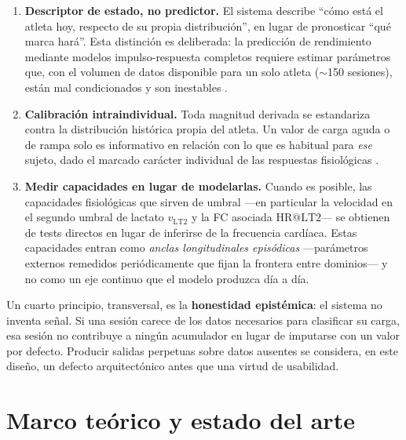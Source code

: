 \documentclass[11pt,a4paper]{article}
\begin{document}
\begin{enumerate}[leftmargin=1.4em,itemsep=2pt]
\item \textbf{Descriptor de estado, no predictor.} El sistema describe ``cómo está el atleta hoy, respecto de su propia distribución'', en lugar de pronosticar ``qué marca hará''. Esta distinción es deliberada: la predicción de rendimiento mediante modelos impulso-respuesta completos requiere estimar parámetros que, con el volumen de datos disponible para un solo atleta ($\sim$150 sesiones), están mal condicionados y son inestables \citep{hellard2006}.
\item \textbf{Calibración intraindividual.} Toda magnitud derivada se estandariza contra la distribución histórica propia del atleta. Un valor de carga aguda o de rampa solo es informativo en relación con lo que es habitual para \emph{ese} sujeto, dado el marcado carácter individual de las respuestas fisiológicas \citep{plews2013,buchheit2014}.
\item \textbf{Medir capacidades en lugar de modelarlas.} Cuando es posible, las capacidades fisiológicas que sirven de umbral —en particular la velocidad en el segundo umbral de lactato $v_{\mathrm{LT2}}$ y la FC asociada $\mathrm{HR@LT2}$— se obtienen de tests directos en lugar de inferirse de la frecuencia cardíaca. Estas capacidades entran como \emph{anclas longitudinales episódicas} —parámetros externos remedidos periódicamente que fijan la frontera entre dominios— y no como un eje continuo que el modelo produzca día a día.
\end{enumerate}

Un cuarto principio, transversal, es la \textbf{honestidad epistémica}: el sistema no inventa señal. Si una sesión carece de los datos necesarios para clasificar su carga, esa sesión no contribuye a ningún acumulador en lugar de imputarse con un valor por defecto. Producir salidas perpetuas sobre datos ausentes se considera, en este diseño, un defecto arquitectónico antes que una virtud de usabilidad.

\section{Marco teórico y estado del arte}
\end{document}

